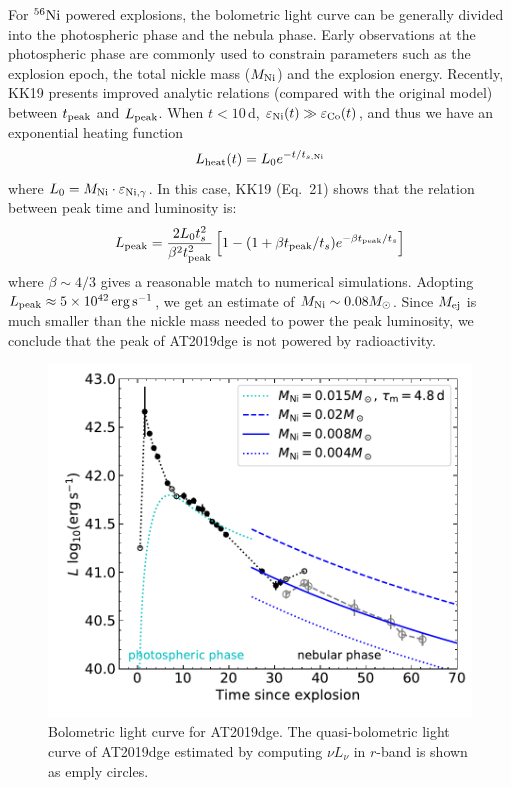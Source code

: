 \documentclass[twocolumn]{aastex63}
\begin{document}
\begin{CJK*}{UTF8}{gbsn}
For $^{56}\rm Ni$ powered explosions, the bolometric light curve can be generally divided into the photospheric phase and the nebula phase. Early observations at the photospheric phase are commonly used to constrain parameters such as the explosion epoch, the total nickle mass ($M_{\rm Ni}$) and the explosion energy. Recently, KK19 presents improved analytic relations (compared with the original \citealt{Arnett1982} model) between $t_{\rm peak}$ and $L_{\rm peak}$. When $t<10$\,d, $\varepsilon_{\rm Ni}(t) \gg \varepsilon_{\rm Co}(t)$, and thus we have an exponential heating function 
\begin{equation}
    L_{\rm heat}(t) = L_0 e^{-t/t_{s, {\rm Ni}}}
\end{equation}
where $L_0 = M_{\rm Ni}\cdot \varepsilon_{\rm Ni, \gamma}$. In this case, KK19 (Eq.~21) shows that the 
relation between peak time and luminosity is:
\begin{equation}
    L_{\rm peak} = \frac{2L_0 t_s^2}{\beta^2 t_{\rm peak}^2} \left[ 1 - (1 + \beta t_{\rm peak}/t_s ) e^{-\beta t_
    {\rm peak}/ t_s} \right]
\end{equation}
where $\beta \sim 4/3$ gives a reasonable match to numerical simulations. Adopting $L_{\rm 
peak}\approx 5\times 10^{42}\,{\rm erg \, s^{-1}}$, we get an estimate of $M_{\rm Ni}\sim 
0.08 M_{\odot}$. Since $M_{\rm ej}$ is much smaller than the nickle mass needed to 
power the peak luminosity, we conclude that the peak of AT2019dge is not powered by radioactivity. 

\begin{figure}
	\centering
	\includegraphics[width=\columnwidth]{figures/Lbb.pdf}
	\caption{Bolometric light curve for AT2019dge. The quasi-bolometric light curve of AT2019dge 
	estimated by computing $\nu L_\nu$ in $r$-band is shown as emply circles.}
	\label{fig:Lbb}
\end{figure}


\end{CJK*}
\end{document}
